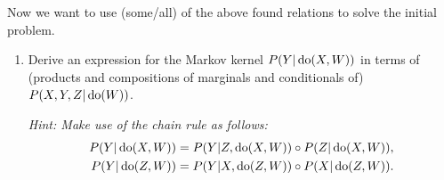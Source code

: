 Now we want to use (some/all) of the above found relations to solve the initial problem.
\begin{enumerate}[resume*]
  \item Derive an expression for the Markov kernel $P(Y|\operatorname{do}(X,W))$ in terms of (products and compositions of
    marginals and conditionals of) $P(X,Y,Z|\operatorname{do}(W))$.

\emph{Hint: Make use of the chain rule as follows: 
\begin{align}
    P(Y|\operatorname{do}(X,W)) &= P(Y|Z,\operatorname{do}(X,W)) \circ P(Z|\operatorname{do}(X,W)), \\
    P(Y|\operatorname{do}(Z,W)) &= P(Y|X,\operatorname{do}(Z,W)) \circ P(X|\operatorname{do}(Z,W)).
\end{align}
}
\end{enumerate}


